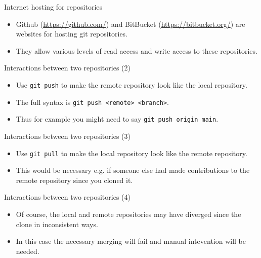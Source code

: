 \documentclass[usenames,dvipsnames]{beamer}
\newcommand{\code}[1]{\colorbox{light-gray}{\texttt{#1}}}
\begin{document}
\begin{frame}{Internet hosting for repositories}
  \begin{block}{}
    \begin{itemize}
      \item{Github (\url{https://github.com/}) and BitBucket (\url{https://bitbucket.org/}) are websites for hosting git repositories.}
      \item{They allow various levels of read access and write access to these repositories.}
    \end{itemize}
  \end{block}
\end{frame}

\begin{frame}{Interactions between two repositories (2)}
  \begin{block}{}
    \begin{itemize}
      \item{Use \code{git push} to make the remote repository look like the local repository.}
      \item{The full syntax is \code{git push <remote> <branch>}.}
      \item{Thus for example you might need to say \code{git push origin main}.}
    \end{itemize}
  \end{block}
\end{frame}

\begin{frame}{Interactions between two repositories (3)}
  \begin{block}{}
    \begin{itemize}
      \item{Use \code{git pull} to make the local repository look like the remote repository.}
      \item{This would be necessary e.g. if someone else had made contributions to the remote repository since you cloned it.}
    \end{itemize}
  \end{block}
\end{frame}

\begin{frame}{Interactions between two repositories (4)}
  \begin{block}{}
    \begin{itemize}
      \item{Of course, the local and remote repositories may have diverged since the clone in inconsistent ways.}
      \item{In this case the necessary merging will fail and manual intevention will be needed.}
    \end{itemize}
  \end{block}
\end{frame}
\end{document}
